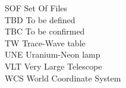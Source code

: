 \begin{tabbing}
SOF       \> Set Of Files \\
TBD       \> To be defined \\
TBC       \> To be confirmed \\
TW       \> Trace-Wave table \\
UNE        \> Uranium-Neon lamp \\
VLT       \> Very Large Telescope \\
WCS       \> World Coordinate System \\
\end{tabbing}
